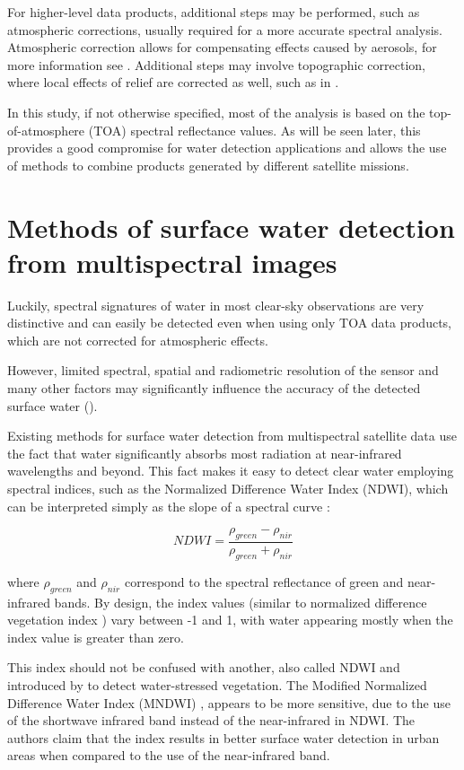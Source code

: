 For higher-level data products, additional steps may be performed, such as atmospheric corrections, usually required for a more accurate spectral analysis. Atmospheric correction allows for compensating effects caused by aerosols, for more information see \citep{gao2006review}. Additional steps may involve topographic correction, where local effects of relief are corrected as well, such as in \citep{Tan2013}.

In this study, if not otherwise specified, most of the analysis is based on the top-of-atmosphere (TOA) spectral reflectance values. As will be seen later, this provides a good compromise for water detection applications and allows the use of methods to combine products generated by different satellite missions. 

\section{Methods of surface water detection from multispectral images}

Luckily, spectral signatures of water in most clear-sky observations are very distinctive and can easily be detected even when using only TOA data products, which are not corrected for atmospheric effects.

However, limited spectral, spatial and radiometric resolution of the sensor and many other factors may significantly influence the accuracy of the detected surface water (\citep{Ji2009}). 

Existing methods for surface water detection from multispectral satellite data use the fact that water significantly absorbs most radiation at near-infrared wavelengths and beyond. This fact makes it easy to detect clear water employing spectral indices, such as the Normalized Difference Water Index (NDWI), which can be interpreted simply as the slope of a spectral curve \citep{McFeeters1996}:

\begin{equation}
NDWI =  \frac{\rho_{green} - \rho_{nir}}{\rho_{green} + \rho_{nir}} 
\label{eq:index_NDWI}
\end{equation}

where $\rho_{green}$ and $\rho_{nir}$ correspond to the spectral reflectance of green and near-infrared bands. By design, the index values (similar to normalized difference vegetation index \citep{rouse1974monitoring}) vary between -1 and 1, with water appearing mostly when the index value is greater than zero.

This index should not be confused with another, also called NDWI and introduced by \citep{Gao1996} to detect water-stressed vegetation. The Modified Normalized Difference Water Index (MNDWI) \citep{Xu2006}, appears to be more sensitive, due to the use of the shortwave infrared band instead of the near-infrared in NDWI. The authors claim that the index results in better surface water detection in urban areas when compared to the use of the near-infrared band.

